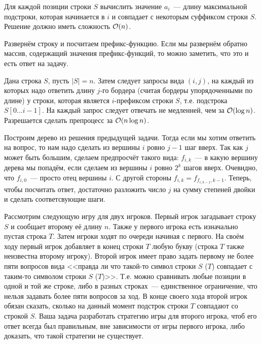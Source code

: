 \documentclass[addpoints]{exam}
\begin{document}
\begin{questions}
\question[\half] Для каждой позиции строки $S$ вычислить значение $a_i$~--- длину максимальной подстроки, которая начинается в $i$ и совпадает с некоторым суффиксом строки $S$. Решение должно иметь сложность $\mathcal{O}(n)$.

\begin{solution}

Развернём строку и посчитаем префикс-функцию. Если мы развернём обратно массив, содержащий значения префикс-функций, то можно заметить, что это и есть ответ на задачу.

\end{solution}

\question[1] Дана строка $S$, пусть $|S| = n$. Затем следует запросы вида $(i,j)$, на каждый из которых надо ответить длину $j$-го бордера (считая бордеры упорядоченными по длине) у строки, которая является $i$-префиксом строки $S$, т.е. подстрока $S[0 \ldots i-1]$. На каждый запрос следует отвечать не медленней, чем за $\mathcal{O}(\log{n})$. Разрешается сделать препроцесс за $\mathcal{O}(n \log n)$.

\begin{solution}

Построим дерево из решения предыдущей задачи. Тогда если мы хотим ответить на вопрос, то нам надо сделать из вершины $i$ ровно $j-1$ шаг вверх. Так как $j$ может быть большим, сделаем предпросчёт такого вида: $f_{i,k}$~--- в какую вершину дерева мы попадём, если сделаем из вершины $i$ ровно $2^k$ шагов вверх. Очевидно, что $f_{i,0}$~--- просто отец вершины $i$. С другой стороны $f_{i,k} = f_{f_{i,k-1},k-1}$. Теперь, чтобы посчитать ответ, достаточно разложить число $j$ на сумму степеней двойки и сделать соответсвующие шаги.

\end{solution}

\question[1] Рассмотрим следующую игру для двух игроков. Первый игрок загадывает строку $S$ и сообщает второму её длину $n$. Также у первого игрока есть изначально пустая строка $T$. Затем игроки ходят по очереди начиная с первого. На своём ходу первый игрок добавляет в конец строки $T$ любую букву (строка $T$ также неизвестна второму игроку). Второй игрок имеет право задать первому не более пяти вопросов вида <<правда ли что такой-то символ строки $S$ ($T$) совпадает с таким-то символом строки $S$ ($T$)>>. Т.е. можно сравнивать любые позиции в одной и той же строке, либо в разных строках~--- единственное ограничение, что нельзя задавать более пяти вопросов за ход. В конце своего хода второй игрок обязан сказать, сколько на данный момент подстрок строки $T$ совпадают со строкой $S$. Ваша задача разработать стратегию игры для второго игрока, чтоб его ответ всегда был правильным, вне зависимости от игры первого игрока, либо доказать, что такой стратегии не существует.


\end{questions}
\end{document}
